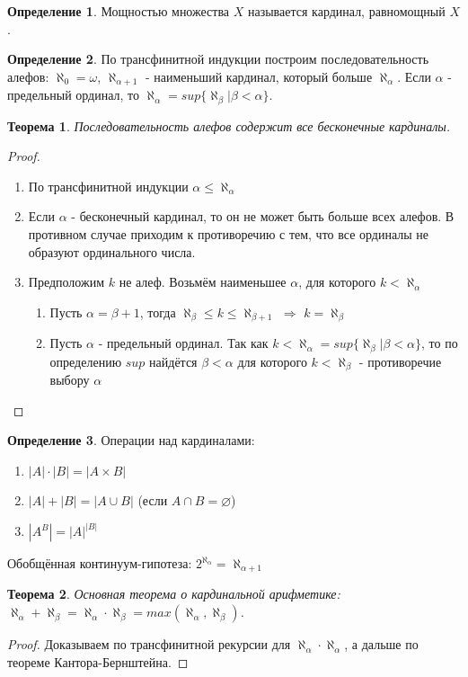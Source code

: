 \documentclass[a4paper, 12pt]{article}
\theoremstyle{definition}
\newtheorem*{definition}{Определение}
\theoremstyle{plain}
\newtheorem*{theorem}{Теорема}
\theoremstyle{remark}
\begin{document}
  \begin{definition}
    Мощностью множества $X$ называется кардинал, равномощный $X$.
  \end{definition}
  \begin{definition}
    По трансфинитной индукции построим последовательность алефов: $\aleph_0=\omega$, $\aleph_{\alpha+1}$ - наименьший кардинал, который больше $\aleph_{\alpha}$. Если $\alpha$ - предельный ординал, то $\aleph_{\alpha}=sup\{\aleph_{\beta}|\beta<\alpha\}$.
  \end{definition}
  \begin{theorem}
    Последовательность алефов содержит все бесконечные кардиналы.
  \end{theorem}
  \begin{proof}
    \begin{enumerate}
      \item По трансфинитной индукции $\alpha\leqslant\aleph_{\alpha}$
      \item Если $\alpha$ - бесконечный кардинал, то он не может быть больше всех алефов. В противном случае приходим к противоречию с тем, что все ординалы не образуют ординального числа.
      \item Предположим $k$ не алеф. Возьмём наименьшее $\alpha$, для которого $k<\aleph_{\alpha}$
      \begin{enumerate}
        \item Пусть $\alpha=\beta+1$, тогда $\aleph_{\beta}\leqslant k\leqslant\aleph_{\beta+1}$ $\Longrightarrow$ $k=\aleph_{\beta}$
        \item Пусть $\alpha$ - предельный ординал. Так как $k<\aleph_{\alpha}=sup\{\aleph_{\beta}|\beta<\alpha\}$, то по определению $sup$ найдётся $\beta<\alpha$ для которого $k<\aleph_{\beta}$ - противоречие выбору $\alpha$
      \end{enumerate}
    \end{enumerate}
  \end{proof}
  \begin{definition}
    Операции над кардиналами:
    \begin{enumerate}
      \item $|A|\cdot|B|=|A\times B|$
      \item $|A|+|B|=|A\cup B|$ (если $A\cap B=\varnothing$)
      \item $|A^B|=|A|^{|B|}$
    \end{enumerate}
    Обобщённая континуум-гипотеза: $2^{\aleph_{\alpha}}=\aleph_{\alpha+1}$
    \begin{theorem}
      Основная теорема о кардинальной арифметике: $\aleph_{\alpha}+\aleph_{\beta}=\aleph_{\alpha}\cdot\aleph_{\beta}=max(\aleph_{\alpha},\aleph_{\beta})$.
    \end{theorem}
    \begin{proof}
      Доказываем по трансфинитной рекурсии для $\aleph_{\alpha}\cdot\aleph_{\alpha}$, а дальше по теореме Кантора-Бернштейна.
    \end{proof}
  \end{definition}
\end{document}
